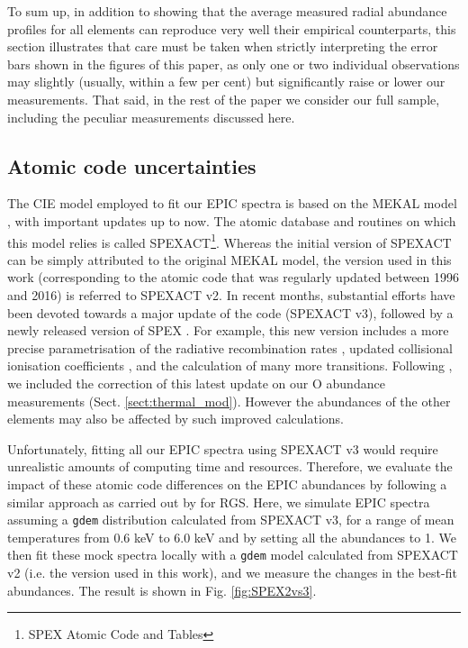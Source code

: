 \documentclass{aa}
\begin{document}
To sum up, in addition to showing that the average measured radial abundance profiles for all elements can reproduce very well their empirical counterparts, this section illustrates that care must be taken when strictly interpreting the error bars shown in the figures of this paper, as only one or two individual observations may slightly (usually, within a few per cent) but significantly raise or lower our measurements. That said, in the rest of the paper we consider our full sample, including the peculiar measurements discussed here.







\subsection{Atomic code uncertainties}\label{sect:systematics_atomic}

The CIE model employed to fit our EPIC spectra is based on the MEKAL model \citep[][also present in XSPEC]{1985A&AS...62..197M,1986A&AS...65..511M}, with important updates up to now. The atomic database and routines on which this model relies is called SPEXACT\footnote{SPEX Atomic Code and Tables}. Whereas the initial version of SPEXACT can be simply attributed to the original MEKAL model, the version used in this work (corresponding to the atomic code that was regularly updated between 1996 and 2016) is referred to SPEXACT v2. In recent months, substantial efforts have been devoted towards a major update of the code (SPEXACT v3), followed by a newly released version of SPEX \citep[see also][]{dePlaa2017}. For example, this new version includes a more precise parametrisation of the radiative recombination rates \citep{2016A&A...587A..84M}, updated collisional ionisation coefficients \citep{2017arXiv170206007U}, and the calculation of many more transitions. Following \citet{2016A&A...592A.157M}, we included the correction of this latest update on our O abundance measurements (Sect. \ref{sect:thermal_mod}). However the abundances of the other elements may also be affected by such improved calculations.

Unfortunately, fitting all our EPIC spectra using SPEXACT v3 would require unrealistic amounts of computing time and resources. Therefore, we evaluate the impact of these atomic code differences on the EPIC abundances by following a similar approach as carried out by \citet{dePlaa2017} for RGS. Here, we simulate EPIC spectra assuming a \texttt{gdem} distribution calculated from SPEXACT v3, for a range of mean temperatures from 0.6 keV to 6.0 keV and by setting all the abundances to 1. We then fit these mock spectra locally with a \texttt{gdem} model calculated from SPEXACT v2 (i.e. the version used in this work), and we measure the changes in the best-fit abundances. The result is shown in Fig. \ref{fig:SPEX2vs3}.
\end{document}
